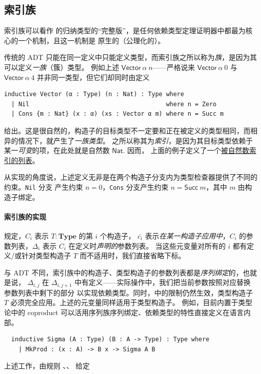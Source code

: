 \documentclass[a4paper, 11pt]{article}
\theoremstyle{remark}\newtheorem*{remark}{Remark}
\theoremstyle{definition}\newtheorem*{definition}{Definition}
\begin{document}
\subsection{索引族}
索引族可以看作 \Tigris 的归纳类型的“完整版”，是任何依赖类型定理证明器中都最为核心的一个机制，且这一机制是
原生的（公理化的）。

传统的 ADT 只能在同一定义中只能定义类型，而索引族之所以称为\emph{族}，是因为其可以定义\emph{一族}（簇）类型。
例如上述 $\mathsf{Vector}\ \alpha\ n$——严格说来 $\mathsf{Vector}\ \alpha\ 0$ 与 $\mathsf{Vector}\ \alpha\ 4$ 并非同一类型，但它们却同时由定义
\begin{verbatim}
inductive Vector (α : Type) (n : Nat) : Type where
  | Nil                                      where n = Zero
  | Cons {m : Nat} (x : α) (xs : Vector α m) where n = Succ m
\end{verbatim}
给出。这是很自然的，构造子的目标类型不一定要和正在被定义的类型相同，而相异的情况下，就产生了\emph{一族类型}。
之所以称其为\emph{索引}，是因为其目标类型依赖于某一\emph{可变}的项，在此处就是自然数 $\mathsf{Nat}$. 因而，
上面的例子定义了一个\underline{被自然数索引的列表}。

从实现的角度说，上述定义无非是在两个构造子分支内为类型检查器提供了不同的约束。\texttt{Nil} 分支
产生约束 $n=0$，\texttt{Cons} 分支产生约束 $n = \mathsf{Succ}\ m$，其中 $m$ 由构造子绑定。

\paragraph{索引族的实现}
规定，$C_i$ 表示 $T : \mathbf{Type}$ 的第 $i$ 个构造子，
$\overline{c_i}$ 表示\emph{在某一构造子应用中}，$C_i$ 的参数列表，$\Delta_i$ 表示 $C_i$ 在定义时\emph{声明的}参数列表。
当这些元变量对所有的 $i$ 都有定义/或针对类型构造子 $T$ 而不适用时，我们直接省略下标。

与 ADT 不同，索引族中的构造子、类型构造子的参数列表都是\emph{序列绑定}的，也就是说，
$\Delta_{i,j}$ 在 $\Delta_{i,j+1}$ 中有定义——实际操作中，我们把当前参数按照对应替换参数列表中剩下的部分
以实现依赖类型。同时，\Tigris 中的限制仍然生效，类型构造子 $T$ 必须完全应用。上述的元变量同样适用于类型构造子。
例如，目前内置于类型论中的 coproduct 可以活用序列族序列绑定、依赖类型的特性直接定义在语言内部。

\begin{verbatim}
  inductive Sigma (A : Type) (B : A -> Type) : Type where
    | MkProd : (x : A) -> B x -> Sigma A B
\end{verbatim}
上述工作，由规则 、、 给定
\end{document}
